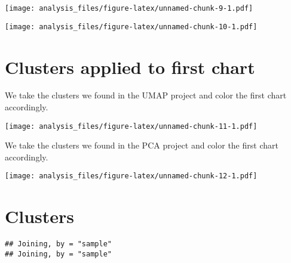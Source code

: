 \documentclass[
]{article}
\begin{document}
\texttt{[image: analysis\_files/figure-latex/unnamed-chunk-9-1.pdf]}

\texttt{[image: analysis\_files/figure-latex/unnamed-chunk-10-1.pdf]}

\hypertarget{clusters-applied-to-first-chart}{%
\section{Clusters applied to first
chart}\label{clusters-applied-to-first-chart}}

We take the clusters we found in the UMAP project and color the first
chart accordingly.

\texttt{[image: analysis\_files/figure-latex/unnamed-chunk-11-1.pdf]}

We take the clusters we found in the PCA project and color the first
chart accordingly.

\texttt{[image: analysis\_files/figure-latex/unnamed-chunk-12-1.pdf]}

\hypertarget{clusters}{%
\section{Clusters}\label{clusters}}

\begin{verbatim}
## Joining, by = "sample"
## Joining, by = "sample"
\end{verbatim}
\end{document}
